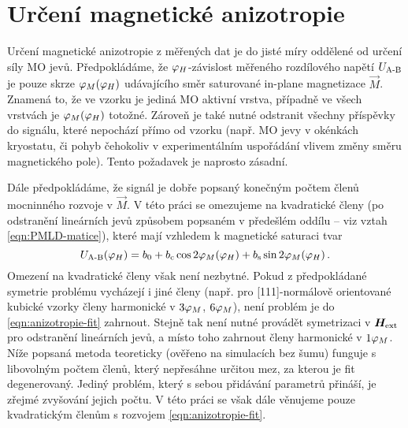\section{Určení magnetické anizotropie}
\label{chap:urceni-magneticke-anizotropie}

Určení magnetické anizotropie z měřených dat je do jisté míry oddělené od určení síly MO jevů.
Předpokládáme, že $\varphi_H$-závislost měřeného rozdílového napětí $U_\textrm{A-B}$ je pouze skrze $\varphi_M(\varphi_H)$ udávajícího směr saturované in-plane magnetizace $\vec{M}$.
Znamená to, že ve vzorku je jediná MO aktivní vrstva, případně ve všech vrstvách je $\varphi_M(\varphi_H)$ totožné.
Zároveň je také nutné odstranit všechny příspěvky do signálu, které nepochází přímo od vzorku (např. MO jevy v okénkách kryostatu, či pohyb čehokoliv v experimentálním uspořádání vlivem změny směru magnetického pole).
Tento požadavek je naprosto zásadní.

Dále předpokládáme, že signál je dobře popsaný konečným počtem členů mocninného rozvoje v $\vec{M}$.
V této práci se omezujeme na kvadratické členy (po odstranění lineárních jevů způsobem popsaném v předešlém oddílu -- viz vztah \eqref{eqn:PMLD-matice}), které mají vzhledem k magnetické saturaci tvar
\begin{equation}
\label{eqn:anizotropie-fit}
    U_\textrm{A-B}(\varphi_H) = b_0 + b_\textrm{c} \cos2\varphi_M(\varphi_H) + b_\textrm{s} \sin2\varphi_M(\varphi_H) \,.
\end{equation}
Omezení na kvadratické členy však není nezbytné.
Pokud z předpokládané symetrie problému vycházejí i jiné členy (např. pro [111]-normálově orientované kubické vzorky členy harmonické v $3\varphi_M$, $6\varphi_M$), není problém je do \eqref{eqn:anizotropie-fit} zahrnout.
Stejně tak není nutné provádět symetrizaci v $\bm{H}_\textrm{ext}$ pro odstranění lineárních jevů, a místo toho zahrnout členy harmonické v $1\varphi_M$.
Níže popsaná metoda teoreticky (ověřeno na simulacích bez šumu) funguje s libovolným počtem členů, který nepřesáhne určitou mez, za kterou je fit degenerovaný.
Jediný problém, který s sebou přidávání parametrů přináší, je zřejmé zvyšování jejich počtu.
V této práci se však dále věnujeme pouze kvadratickým členům s rozvojem \eqref{eqn:anizotropie-fit}.

